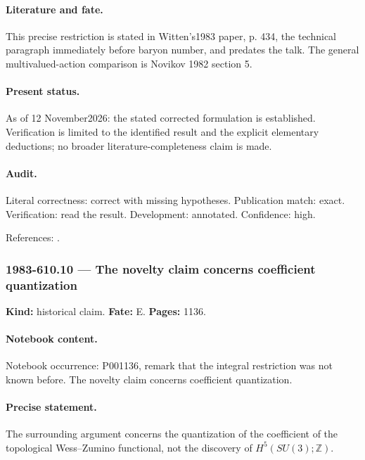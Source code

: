 \paragraph{Literature and fate.} This precise restriction is stated in Witten's1983 paper, p. 434, the technical paragraph immediately before baryon number, and predates the talk. The general multivalued-action comparison is Novikov 1982 section 5. \cite{witten1983current,novikov1982hamiltonian}

\paragraph{Present status.} As of 12 November2026: the stated corrected formulation is established. Verification is limited to the identified result and the explicit elementary deductions; no broader literature-completeness claim is made.

\paragraph{Audit.} Literal correctness: correct with missing hypotheses. Publication match: exact. Verification: read the result. Development: annotated. Confidence: high.

\noindent References: \citep{witten1983current,novikov1982hamiltonian}.\par

\subsubsection{1983-610.10 --- The novelty claim concerns coefficient quantization}

\label{item:1983-610.10}

\noindent\textbf{Kind:} historical claim. \textbf{Fate:} E. \textbf{Pages:} 1136.\par

\paragraph{Notebook content.} Notebook occurrence: P001136, remark that the integral restriction was not known before. The novelty claim concerns coefficient quantization.

\paragraph{Precise statement.} The surrounding argument concerns the quantization of the coefficient of the topological Wess--Zumino functional, not the discovery of \(H^5(SU(3);\mathbb Z)\).


